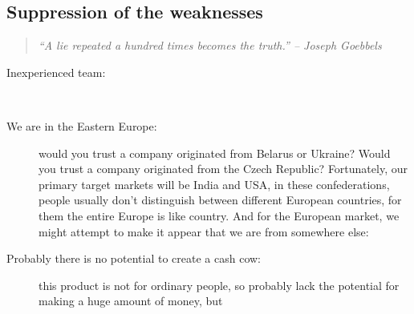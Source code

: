 \documentclass[a4paper,twoside,15pt]{book}
\begin{document}
        \subsection{Suppression of the weaknesses}
            \begin{quote}
                \textit{``A lie repeated a hundred times becomes the truth.'' -- Joseph Goebbels}
            \end{quote}
             \begin{description}
                \item[Inexperienced team:]~
                \item[We are in the Eastern Europe:]
                    would you trust a company originated from Belarus or Ukraine? Would you trust a company originated from the Czech Republic? Fortunately, our primary target markets will be India and USA, in these confederations, people usually don't distinguish between different European countries, for them the entire Europe is like country. And for the European market, we might attempt to make it appear that we are from somewhere else:
                \item[Probably there is no potential to create a cash cow:]
                    this product is not for ordinary people, so probably lack the potential for making a huge amount of money, but
\end{description}
\end{document}
